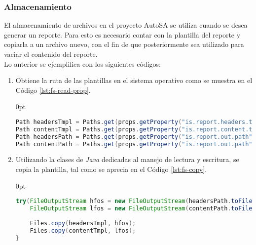 \subsubsection{Almacenamiento}
El almacenamiento de archivos en el proyecto AutoSA se utiliza cuando se desea generar un reporte. Para esto es necesario contar con la plantilla del reporte y copiarla a un archivo nuevo, con el fin de que posteriormente sea utilizado para vaciar el contenido del reporte.\\
Lo anterior se ejemplifica con los siguientes códigos:
\begin{enumerate}
	\item Obtiene la ruta de las plantillas en el sistema operativo como se muestra en el Código \ref{lst:fs-read-prop}.
	\begin{adjustwidth}{\listingfixwidth}{0pt}
	\begin{lstlisting}[language=Java, caption={Obtención de las rutas de las plantillas.}, captionpos=b, label={lst:fs-read-prop}]
Path headersTmpl = Paths.get(props.getProperty("is.report.headers.tmpl"));
Path contentTmpl = Paths.get(props.getProperty("is.report.content.tmpl"));
Path headersPath = Paths.get(props.getProperty("is.report.out.path"), headersTmpl.getFileName().toString());
Path contentPath = Paths.get(props.getProperty("is.report.out.path"), contentTmpl.getFileName().toString());
	\end{lstlisting}
	\end{adjustwidth}
	\item Utilizando la clases de \textit{Java} dedicadas al manejo de lectura y escritura, se copia la plantilla, tal como se aprecia en el Código \ref{lst:fs-copy}.
	\begin{adjustwidth}{\listingfixwidth}{0pt}
	\begin{lstlisting}[language=Java, caption={Copia de archivos.}, captionpos=b, label={lst:fs-copy}]
try(FileOutputStream hfos = new FileOutputStream(headersPath.toFile(), false);
	FileOutputStream lfos = new FileOutputStream(contentPath.toFile(), false)){
		
	Files.copy(headersTmpl, hfos);
	Files.copy(contentTmpl, lfos);
}
	\end{lstlisting}
	\end{adjustwidth}
\end{enumerate}
